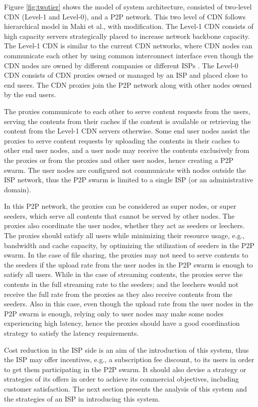 \documentclass[paper]{ieice}
\begin{document}
Figure \ref{fig:twotier} shows the model of system architecture, consisted of two-level CDN (Level-1 and Level-0), and a P2P network.
This two level of CDN follows hierarchical model in Maki et al.,\cite{NaoyaMAKI2012} with modification.
The Level-1 CDN consists of high capacity servers strategically placed to increase network backbone capacity.
The Level-1 CDN is similar to the current CDN networks, where CDN nodes can communicate each other by using common interconnect interface even though the CDN nodes are owned by different companies or different ISPs \cite{cdni}.
The Level-0 CDN consists of CDN proxies owned or managed by an ISP and placed close to end users.
The CDN proxies join the P2P network along with other nodes owned by the end users.

The proxies communicate to each other to serve content requests from the users, serving the contents from their caches if the content is available 
or retrieving the content from the Level-1 CDN servers otherwise.
Some end user nodes assist the proxies to serve content requests by uploading the contents in their caches to other end user nodes, and a user node may receive the contents exclusively from the proxies or from the proxies and other user nodes, hence creating a P2P swarm.
The user nodes are configured not communicate with nodes outside the ISP network, thus the P2P swarm is limited to a single ISP (or an administrative domain).

In this P2P network, the proxies can be considered as super nodes, or super seeders, which serve all contents that cannot be served by other nodes.
The proxies also coordinate the user nodes, whether they act as seeders or leechers.
The proxies should satisfy all users while minimizing their resource usage, e.g., bandwidth and cache capacity, by optimizing the utilization of seeders in the P2P swarm.
In the case of file sharing, the proxies may not need to serve contents to the seeders if the upload rate from the user nodes in the P2P swarm is enough to satisfy all users.
While in the case of streaming contents, the proxies serve the contents in the full streaming rate to the seeders;
and the leechers would not receive the full rate from the proxies as they also receive contents from the seeders.
Also in this case, even though the upload rate from the user nodes in the P2P swarm is enough, relying only to user nodes may make some nodes experiencing high latency,
hence the proxies should have a good coordination strategy to satisfy the latency requirements.

Cost reduction in the ISP side is an aim of the introduction of this system, thus the ISP may offer incentives, e.g., a subscription fee discount, to its users in order to get them participating in the P2P swarm.
It should also devise a strategy or strategies of its offers in order to achieve its commercial objectives, including customer satisfaction.
The next section presents the analysis of this system and the strategies of an ISP in introducing this system.
\end{document}
